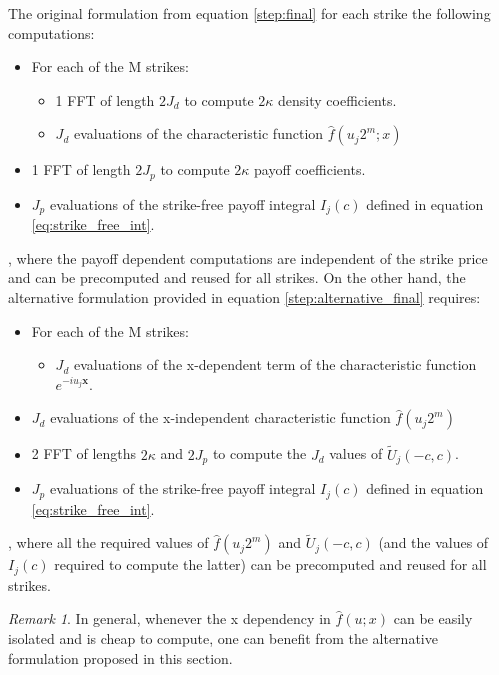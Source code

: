 \documentclass[12,twoside]{mammeTFM}
\theoremstyle{definition}
\theoremstyle{remark}
\newtheorem{remark}[thm]{Remark}
\begin{document}
The original formulation from equation \ref{step:final} for each strike the following computations: 
\begin{itemize}
\item For each of the M strikes:
\begin{itemize}
\item 1 FFT of length $2J_d$ to compute $2\kappa$ density coefficients.
\item $J_d$ evaluations of the characteristic function $\hat{f}(u_j 2^m;x)$
\end{itemize}
\item 1 FFT of length $2J_p$ to compute $2\kappa$ payoff coefficients.
\item $J_p$ evaluations of the strike-free payoff integral $I_j(c)$ defined in equation \ref{eq:strike_free_int}.
\end{itemize}

, where the payoff dependent computations are independent of the strike price and can be precomputed and reused for all strikes.
On the other hand, the alternative formulation provided in equation \ref{step:alternative_final} requires:

\begin{itemize}
\item For each of the M strikes:
\begin{itemize}
\item $J_d$ evaluations of the x-dependent term of the characteristic function $e^{-iu_j \boldsymbol{x}}$.
\end{itemize}
\item $J_d$ evaluations of the x-independent characteristic function $\hat{f}(u_j 2^m)$
\item 2 FFT of lengths $2 \kappa$ and $2J_p$ to compute the $J_d$ values of $\tilde{U}_j(-c,c)$.
\item $J_p$ evaluations of the strike-free payoff integral $I_j(c)$ defined in equation \ref{eq:strike_free_int}.
\end{itemize}

, where all the required values of $\hat{f}(u_j 2^m)$ and $\tilde{U}_j(-c,c)$ (and the values of $I_j(c)$ required to compute the latter) can be precomputed and reused for all strikes.

\begin{remark}
In general, whenever the x dependency in $\hat{f}(u; x)$ can be easily isolated and is cheap to compute, one can benefit from the alternative formulation proposed in this section.
\end{remark}
\end{document}

